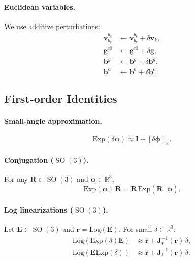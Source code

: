 \paragraph{Euclidean variables.}
We use additive perturbations:
\begin{equation}
\begin{aligned}
\mathbf{v}_{b_k}^{b_k} &\leftarrow \mathbf{v}_{b_k}^{b_k} + \delta\mathbf{v}_k,\\
\mathbf{g}^{c0} &\leftarrow \mathbf{g}^{c0} + \delta\mathbf{g},\\
\mathbf{b}^g &\leftarrow \mathbf{b}^g + \delta\mathbf{b}^g,\\
\mathbf{b}^a &\leftarrow \mathbf{b}^a + \delta\mathbf{b}^a.
\end{aligned}
\end{equation}

\subsection{First-order Identities}

\paragraph{Small-angle approximation.}
\begin{equation}
\text{Exp}(\delta\boldsymbol{\phi}) \approx \mathbf{I} + [\delta\boldsymbol{\phi}]_\times.
\end{equation}

\paragraph{Conjugation ($\operatorname{SO}(3)$).}
For any $\mathbf{R}\in\operatorname{SO}(3)$ and $\boldsymbol{\phi}\in\mathbb{R}^3$,
\begin{equation}
\text{Exp}(\boldsymbol{\phi})\,\mathbf{R} = \mathbf{R}\,\text{Exp}(\mathbf{R}^\top \boldsymbol{\phi}).
\label{eq:maci2:conj_so3}
\end{equation}

\paragraph{Log linearizations ($\operatorname{SO}(3)$).}
Let $\mathbf{E}\in\operatorname{SO}(3)$ and $\mathbf{r}=\text{Log}(\mathbf{E})$.
For small $\delta\in\mathbb{R}^3$:
\begin{align}
\text{Log}(\text{Exp}(\delta)\mathbf{E}) &\approx \mathbf{r} + \mathbf{J}_r^{-1}(\mathbf{r})\,\delta,
\label{eq:maci2:log_leftmult_so3}\\
\text{Log}(\mathbf{E}\text{Exp}(\delta)) &\approx \mathbf{r} + \mathbf{J}_l^{-1}(\mathbf{r})\,\delta.
\label{eq:maci2:log_rightmult_so3}
\end{align}

